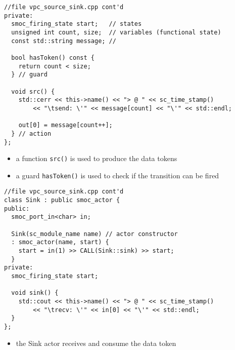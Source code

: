 \begin{frame}[fragile=singleslide]
\begin{lstlisting}
//file vpc_source_sink.cpp cont'd
private:
  smoc_firing_state start;   // states
  unsigned int count, size;  // variables (functional state)
  const std::string message; //

  bool hasToken() const {
    return count < size;
  } // guard

  void src() {
    std::cerr << this->name() << "> @ " << sc_time_stamp()
        << "\tsend: \'" << message[count] << "\'" << std::endl;

    out[0] = message[count++];
  } // action
};
\end{lstlisting}
\begin{itemize}
\item a function \lstinline!src()! is used to produce the data tokens
\item a guard \lstinline!hasToken()! is used to check if the transition can be fired
\end{itemize}
\end{frame}


\begin{frame}[fragile=singleslide]
\begin{lstlisting}
//file vpc_source_sink.cpp cont'd
class Sink : public smoc_actor {
public:
  smoc_port_in<char> in;

  Sink(sc_module_name name) // actor constructor
  : smoc_actor(name, start) {
    start = in(1) >> CALL(Sink::sink) >> start;
  }
private:
  smoc_firing_state start;

  void sink() {
    std::cout << this->name() << "> @ " << sc_time_stamp()
        << "\trecv: \'" << in[0] << "\'" << std::endl;
  }
};
\end{lstlisting}
\begin{itemize}
\item the Sink actor receives and consume the data token
\end{itemize}
\end{frame}



